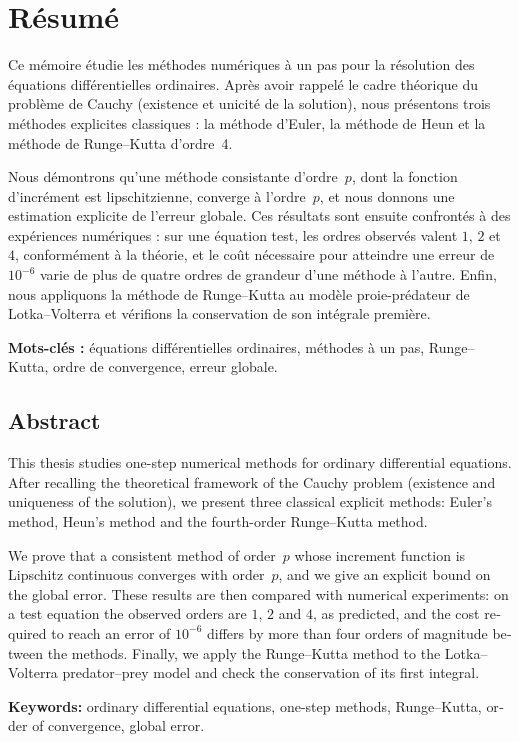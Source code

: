 \chapter*{Résumé}

Ce mémoire étudie les méthodes numériques à un pas pour la résolution des équations différentielles ordinaires. Après avoir rappelé le cadre théorique du problème de Cauchy (existence et unicité de la solution), nous présentons trois méthodes explicites classiques : la méthode d'Euler, la méthode de Heun et la méthode de Runge--Kutta d'ordre~4.

Nous démontrons qu'une méthode consistante d'ordre~$p$, dont la fonction d'incrément est lipschitzienne, converge à l'ordre~$p$, et nous donnons une estimation explicite de l'erreur globale. Ces résultats sont ensuite confrontés à des expériences numériques : sur une équation test, les ordres observés valent $1$, $2$ et $4$, conformément à la théorie, et le coût nécessaire pour atteindre une erreur de $10^{-6}$ varie de plus de quatre ordres de grandeur d'une méthode à l'autre. Enfin, nous appliquons la méthode de Runge--Kutta au modèle proie-prédateur de Lotka--Volterra et vérifions la conservation de son intégrale première.

\bigskip
\noindent\textbf{Mots-clés :} équations différentielles ordinaires, méthodes à un pas, Runge--Kutta, ordre de convergence, erreur globale.

\clearpage
\begin{otherlanguage}{english}
\chapter*{Abstract}

This thesis studies one-step numerical methods for ordinary differential equations. After recalling the theoretical framework of the Cauchy problem (existence and uniqueness of the solution), we present three classical explicit methods: Euler's method, Heun's method and the fourth-order Runge--Kutta method.

We prove that a consistent method of order~$p$ whose increment function is Lipschitz continuous converges with order~$p$, and we give an explicit bound on the global error. These results are then compared with numerical experiments: on a test equation the observed orders are $1$, $2$ and $4$, as predicted, and the cost required to reach an error of $10^{-6}$ differs by more than four orders of magnitude between the methods. Finally, we apply the Runge--Kutta method to the Lotka--Volterra predator--prey model and check the conservation of its first integral.

\bigskip
\noindent\textbf{Keywords:} ordinary differential equations, one-step methods, Runge--Kutta, order of convergence, global error.
\end{otherlanguage}

